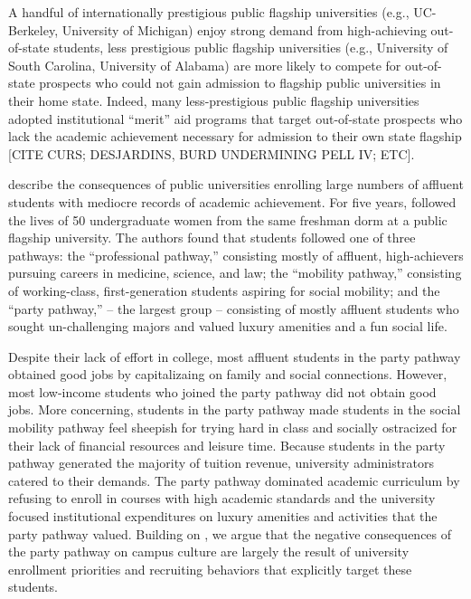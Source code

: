 \documentclass[twoside]{article}
\begin{document}
A handful of internationally prestigious public flagship universities (e.g., UC-Berkeley, University of Michigan) enjoy strong demand from high-achieving out-of-state students, less prestigious public flagship universities (e.g., University of South Carolina, University of Alabama) are more likely to compete for out-of-state prospects who could not gain admission to flagship public universities in their home state.  Indeed, many less-prestigious public flagship universities adopted institutional ``merit'' aid programs that target out-of-state prospects who lack the academic achievement necessary for admission to their own state flagship [CITE CURS; DESJARDINS, BURD UNDERMINING PELL IV; ETC].

\cite{RN4231} describe the consequences of public universities enrolling large numbers of affluent students with mediocre records of academic achievement.  For five years, \cite{RN4231} followed the lives of 50 undergraduate women from the same freshman dorm at a public flagship university. The authors found that students followed one of three pathways: the ``professional pathway,'' consisting mostly of affluent, high-achievers pursuing careers in medicine, science, and law; the ``mobility pathway,'' consisting of working-class, first-generation students aspiring for social mobility; and the ``party pathway,'' -- the largest group -- consisting of mostly affluent students who sought un-challenging majors and valued luxury amenities and a fun social life. 

Despite their lack of effort in college, most affluent students in the party pathway obtained good jobs by capitalizaing on family and social connections. However, most low-income students who joined the party pathway did not obtain good jobs. More concerning, students in the party pathway made students in the social mobility pathway feel sheepish for trying hard in class and socially ostracized for their lack of financial resources and leisure time.  Because students in the party pathway generated the majority of tuition revenue, university administrators catered to their demands. The party pathway dominated academic curriculum by refusing to enroll in courses with high academic standards and the university focused institutional expenditures on luxury amenities and activities that the party pathway valued.  Building on \cite{RN4231}, we argue that the negative consequences of the party pathway on campus culture are largely the result of university enrollment priorities and recruiting behaviors that explicitly target these students.
\end{document}
